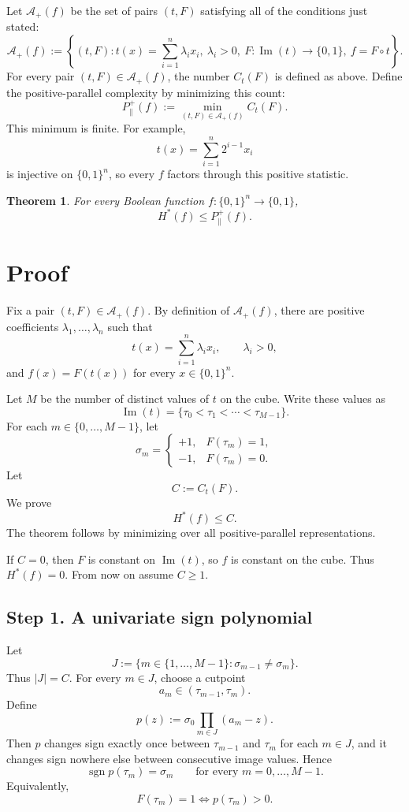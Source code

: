 \documentclass[11pt]{article}
\newtheorem*{theorem}{Theorem}
\newcommand{\cube}{\{0,1\}}
\newcommand{\Hstar}{H^{\ast}}
\newcommand{\sgn}{\operatorname{sgn}}
\newcommand{\im}{\operatorname{Im}}
\begin{document}
Let $\mathcal A_+(f)$ be the set of pairs $(t,F)$ satisfying all of the
conditions just stated:
\[
\mathcal A_+(f):=
\left\{
(t,F):
t(x)=\sum_{i=1}^{n}\lambda_i x_i,\ \lambda_i>0,\ F:\im(t)\to\cube,\ f=F\circ t
\right\}.
\]
For every pair $(t,F)\in\mathcal A_+(f)$, the number $C_t(F)$ is defined as
above.  Define the positive-parallel complexity by minimizing this count:
\[
P_{\parallel}^{+}(f):=
\min_{(t,F)\in\mathcal A_+(f)} C_t(F).
\]
This minimum is finite.  For example,
\[
t(x)=\sum_{i=1}^{n}2^{i-1}x_i
\]
is injective on $\cube^n$, so every $f$ factors through this positive statistic.

\begin{theorem}
For every Boolean function $f:\cube^n\to\cube$,
\[
\Hstar(f)\leq P_{\parallel}^{+}(f).
\]
\end{theorem}

\section*{Proof}

Fix a pair $(t,F)\in\mathcal A_+(f)$.  By definition of $\mathcal A_+(f)$,
there are positive coefficients $\lambda_1,\ldots,\lambda_n$ such that
\[
t(x)=\sum_{i=1}^{n}\lambda_i x_i,
\qquad
\lambda_i>0,
\]
and $f(x)=F(t(x))$ for every $x\in\cube^n$.

Let $M$ be the number of distinct values of $t$ on the cube.  Write these values
as
\[
\im(t)=\{\tau_0<\tau_1<\cdots<\tau_{M-1}\}.
\]
For each $m\in\{0,\ldots,M-1\}$, let
\[
\sigma_m=
\begin{cases}
+1,&F(\tau_m)=1,\\
-1,&F(\tau_m)=0.
\end{cases}
\]
Let
\[
C:=C_t(F).
\]
We prove
\[
\Hstar(f)\leq C.
\]
The theorem follows by minimizing over all positive-parallel representations.

If $C=0$, then $F$ is constant on $\im(t)$, so $f$ is constant on the cube.
Thus $\Hstar(f)=0$.  From now on assume $C\geq1$.

\subsection*{Step 1. A univariate sign polynomial}

Let
\[
J:=\{m\in\{1,\ldots,M-1\}:\sigma_{m-1}\neq\sigma_m\}.
\]
Thus $|J|=C$.  For every $m\in J$, choose a cutpoint
\[
a_m\in(\tau_{m-1},\tau_m).
\]
Define
\[
p(z):=\sigma_0\prod_{m\in J}(a_m-z).
\]
Then $p$ changes sign exactly once between $\tau_{m-1}$ and $\tau_m$ for each
$m\in J$, and it changes sign nowhere else between consecutive image values.
Hence
\[
\sgn p(\tau_m)=\sigma_m
\qquad
\text{for every }m=0,\ldots,M-1.
\]
Equivalently,
\[
F(\tau_m)=1
\iff
p(\tau_m)>0.
\]
\end{document}
